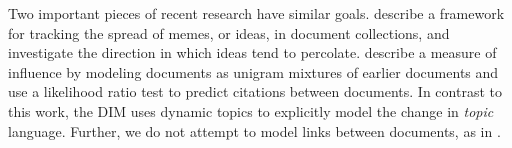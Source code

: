 Two important pieces of recent research have similar
goals. \cite{leskovec:2009} describe a framework for tracking the  %
spread of memes, or ideas, in document collections, and investigate
the direction in which ideas tend to percolate.
\cite{shaparenko:2007} describe a measure of influence by modeling   %
documents as unigram mixtures of earlier documents and use a
likelihood ratio test to predict citations between documents. In
contrast to this work, the DIM uses dynamic topics to explicitly model
the change in \emph{topic} language.  Further, we do not attempt to
model links between documents, as in \cite{shaparenko:2007}.  %

